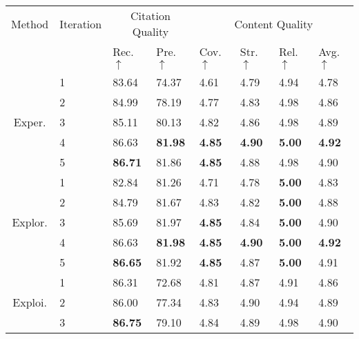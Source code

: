 \documentclass[manuscript,review,anonymous]{acmart}
\begin{document}
\begin{table}[h]
    \centering
    \begin{adjustbox}{width=\columnwidth}
        \begin{tabular}{clllllll}
            \toprule
            \multirow{2.5}{*}{Method} & \multirow{2.5}{*}{Iteration} & \multicolumn{2}{c}{Citation Quality} & \multicolumn{4}{c}{Content Quality} \\
            \cmidrule(lr){3-4} \cmidrule(lr){5-8}
            & & Rec. $\uparrow$ & Pre. $\uparrow$ & Cov. $\uparrow$ & Str. $\uparrow$ & Rel. $\uparrow$ & Avg. $\uparrow$ \\
            \midrule
            \multirow{5}{*}{Exper.}
            & 1 & 83.64 & 74.37 & 4.61 & 4.79 & 4.94 & 4.78 \\
            & 2 & 84.99 & 78.19 & 4.77 & 4.83 & 4.98 & 4.86 \\
            & 3 & 85.11 & 80.13 & 4.82 & 4.86 & 4.98 & 4.89 \\
            & \cellcolor{gray!15}4 & \cellcolor{gray!15}86.63 & \cellcolor{gray!15}\textbf{81.98} & \cellcolor{gray!15}\textbf{4.85} & \cellcolor{gray!15}\textbf{4.90} & \cellcolor{gray!15}\textbf{5.00} & \cellcolor{gray!15}\textbf{4.92} \\
            & 5 & \textbf{86.71} & 81.86 & \textbf{4.85} & 4.88 & 4.98 & 4.90 \\
            \midrule
            \multirow{5}{*}{Explor.}
            & 1 & 82.84 & 81.26 & 4.71 & 4.78 & \textbf{5.00} & 4.83 \\
            & 2 & 84.79 & 81.67 & 4.83 & 4.82 & \textbf{5.00} & 4.88 \\
            & 3 & 85.69 & 81.97 & \textbf{4.85} & 4.84 & \textbf{5.00} & 4.90 \\
            & \cellcolor{gray!15}4 & \cellcolor{gray!15}86.63 & \cellcolor{gray!15}\textbf{81.98} & \cellcolor{gray!15}\textbf{4.85} & \cellcolor{gray!15}\textbf{4.90} & \cellcolor{gray!15}\textbf{5.00} & \cellcolor{gray!15}\textbf{4.92} \\
            & 5 & \textbf{86.65} & 81.92 & \textbf{4.85} & 4.87 & \textbf{5.00} & 4.91 \\
            \midrule
            \multirow{5}{*}{Exploi.}
            & 1 & 86.31 & 72.68 & 4.81 & 4.87 & 4.91 & 4.86 \\
            & 2 & 86.00 & 77.34 & 4.83 & 4.90 & 4.94 & 4.89 \\
            & 3 & \textbf{86.75} & 79.10 & 4.84 & 4.89 & 4.98 & 4.90 \\

\end{tabular}
\end{adjustbox}
\end{table}
\end{document}
